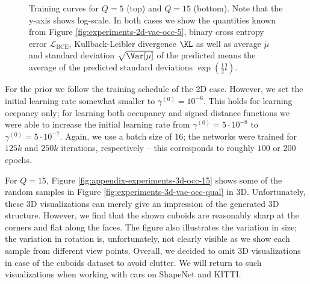 \begin{figure}
\begin{subfigure}[t]{0.48\textwidth}
  \end{subfigure}
  \caption{Training curves for $Q = 5$ (top) and $Q = 15$ (bottom).
  Note that the y-axis shows log-scale.
  In both cases we show the quantities known from Figure \ref{fig:experiments-2d-vae-occ-5},
  \ie binary cross entropy error $\mathcal{L}_{\text{BCE}}$,
  Kullback-Leibler divergence $\KL$ as well as average $\overline{\mu}$
  and standard deviation $\sqrt{\Var[\mu]}$ of the predicted means the average
  of the predicted standard deviations $\exp(\frac{1}{2}\overline{l})$.}
  \label{fig:experiments-3d-vae-occ}
\end{figure}

For the \VAE prior we follow the training schedule of the 2D case.
However, we set the initial learning rate
somewhat smaller to $\gamma^{(0)} = 10^{-6}$. This holds for learning
occpancy only; for learning both occupancy and signed distance functions
we were able to increase the initial learning rate from
$\gamma^{(0)} = 5 \cdot 10^{-8}$ to $\gamma^{(0)} = 5 \cdot 10^{-7}$.
Again, we use a batch size of $16$; the networks were trained for $125k$
and $250k$ iterations, respectively -- this corresponds to roughly $100$ or
$200$ epochs.

For $Q = 15$, Figure \ref{fig:appendix-experiments-3d-occ-15} shows some of the
random samples in Figure \ref{fig:experiments-3d-vae-occ-qual} in 3D.
Unfortunately, these 3D visualizations can merely give an impression of the
generated 3D structure. However, we find that the shown cuboids are reasonably
sharp at the corners and flat along the faces. The figure also illustrates
the variation in size; the variation in rotation is, unfortunately, not
clearly visible as we show each sample from different view points. Overall,
we decided to omit 3D visualizations in case of the cuboids dataset to avoid
clutter. We will return to such visualizations when working with cars on ShapeNet
and KITTI.

